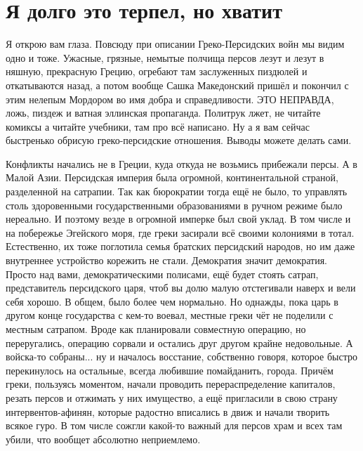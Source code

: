 \chapter{Я долго это терпел, но хватит}




Я открою вам глаза. Повсюду при описании Греко-Персидских войн мы видим одно и тоже. Ужасные, грязные, немытые полчища персов лезут и лезут в няшную, прекрасную Грецию, огребают там заслуженных пиздюлей и откатываются назад, а потом вообще Сашка Македонский пришёл и покончил с этим нелепым Мордором во имя добра и справедливости. ЭТО НЕПРАВДА, ложь, пиздеж и ватная эллинская пропаганда. Политрук лжет, не читайте комиксы а читайте учебники, там про всё написано. Ну а я вам сейчас быстренько обрисую греко-персидские отношения. Выводы можете делать сами.


Конфликты начались не в Греции, куда откуда не возьмись прибежали персы. А в Малой Азии. Персидская империя была огромной, континентальной страной, разделенной на сатрапии. Так как бюрократии тогда ещё не было, то управлять столь здоровенными государственными образованиями в ручном режиме было нереально. И поэтому везде в огромной имперке был свой уклад. В том числе и на побережье Эгейского моря, где греки засирали всё своими колониями в тотал. Естественно, их тоже поглотила семья братских персидский народов, но им даже внутреннее устройство корежить не стали. Демократия значит демократия. Просто над вами, демократическими полисами, ещё будет стоять сатрап, представитель персидского царя, чтоб вы долю малую отстегивали наверх и вели себя хорошо. В общем, было более чем нормально. Но однажды, пока царь в другом конце государства с кем-то воевал, местные греки чёт не поделили с местным сатрапом. Вроде как планировали совместную операцию, но переругались, операцию сорвали и остались друг другом крайне недовольные. А войска-то собраны... ну и началось восстание, собственно говоря, которое быстро перекинулось на остальные, всегда любившие помайданить, города. Причём греки, пользуясь моментом, начали проводить перераспределение капиталов, резать персов и отжимать у них имущество, а ещё пригласили в свою страну интервентов-афинян, которые радостно вписались в движ и начали творить всякое гуро. В том числе сожгли какой-то важный для персов храм и всех там убили, что вообщет абсолютно неприемлемо.


